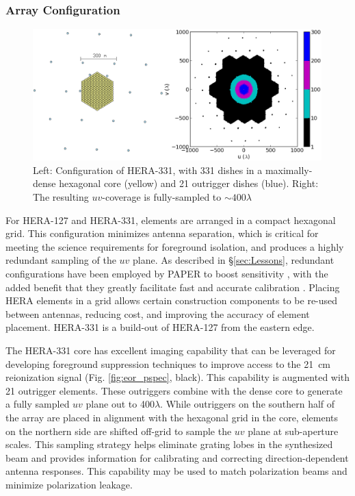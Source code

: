 \documentclass[preprint]{aastex}
\newcommand{\Mycitep}[1]{{\bf \citep{#1}}}
\newcommand{\compress}{\vspace{-0.25in}}
\newcommand{\Caption}[4]{\vspace{#1}\renewcommand{\baselinestretch}{#2}\caption{#4}\vspace{#3}}
\begin{document}
\compress
\subsubsection{Array Configuration}

\begin{figure}[t]
\centering
		\includegraphics[height=2in]{plots/config_uv_consolidated.png}
\Caption{-0.15in}{0.99}{-0.1in}{\small
Left: Configuration of HERA-331, with 331 dishes in a maximally-dense hexagonal core (yellow) and 21 outrigger dishes (blue).  Right: The resulting $uv$-coverage is fully-sampled to $\sim 400\lambda$ 
}\label{fig:uv_coverage}
\end{figure}

For HERA-127 and HERA-331, elements are arranged in a compact hexagonal grid.
This configuration minimizes antenna separation, which is critical for meeting
the science requirements for foreground isolation, and 
produces a highly redundant sampling of the $uv$ plane.  As described in
\S\ref{sec:Lessons}, redundant configurations have been employed by PAPER to
boost sensitivity \Mycitep{parsons_et_al2012a}, with the added benefit that they
greatly facilitate fast and accurate calibration
\Mycitep{liu_et_al2010,parsons_et_al2013}.  Placing HERA elements in a
grid allows certain construction components to be re-used between antennas,
reducing cost, and improving the accuracy of element placement.  HERA-331 
is a build-out of HERA-127 from the eastern edge.

The HERA-331 core has excellent
imaging capability that can be leveraged for developing foreground suppression techniques
to improve access to the 21~cm reionization signal 
(Fig. \ref{fig:eor_pspec}, black).
This capability is augmented with 21 outrigger elements.  These outriggers
combine with the dense core to generate a fully
sampled $uv$ plane out to 400$\lambda$.  While outriggers on the southern half of the array are
placed in alignment with the hexagonal grid in the core, elements on the northern side are
shifted off-grid to sample the $uv$ plane at sub-aperture scales.
This sampling strategy helps eliminate grating lobes in the
synthesized beam and provides information for
calibrating and correcting direction-dependent antenna responses.  This capability may
be used to match polarization beams and minimize
polarization leakage.
\end{document}

